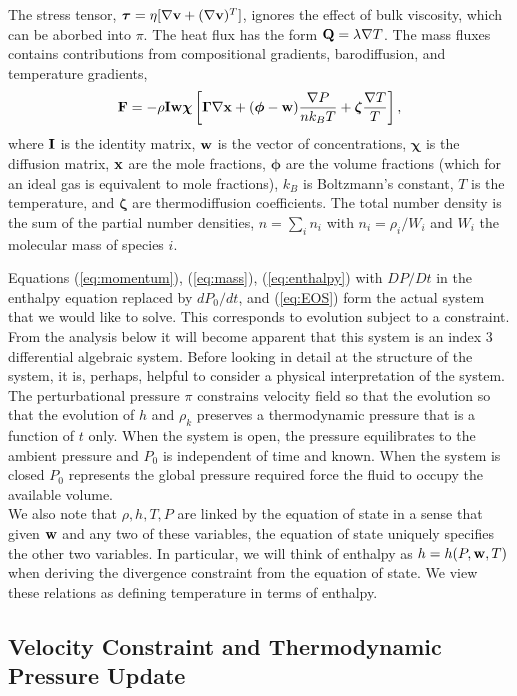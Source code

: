 \documentclass[final]{siamltex}
\def\Fb {{\bf F}}
\def\Ib {{\bf I}}
\def\Qb {{\bf Q}}
\def\vb {{\bf v}}
\def\wb {{\bf w}}
\def\xb {{\bf x}}
\def\chib   {\boldsymbol{\chi}}
\def\Gammab {\boldsymbol{\Gamma}}
\def\phib   {\boldsymbol{\phi}}
\def\taub   {\boldsymbol{\tau}}
\def\zetab  {\boldsymbol{\zeta}}
\begin{document}
The stress tensor,
$\taub = \eta[\nabla\vb + (\nabla\vb)^T]$,
ignores the effect of bulk viscosity, which can be aborbed into $\pi$.
The heat flux has the form $\Qb = \lambda\nabla T$.
The mass fluxes contains contributions from 
compositional gradients, barodiffusion, and temperature gradients,
\begin{equation}
\Fb = -\rho\Ib\wb\chib\left[\Gammab\nabla\xb + (\phib - \wb)\frac{\nabla P}{n k_B T} + \zetab\frac{\nabla T}{T}\right],
\end{equation}
where $\Ib$ is the identity matrix, $\wb$ is the vector of concentrations,
$\chib$ is the diffusion matrix, $\xb$ are the mole fractions,
$\phib$ are the volume fractions (which for an ideal gas is equivalent to mole fractions),
$k_B$ is Boltzmann's constant,
$T$ is the temperature, and $\zetab$ are thermodiffusion coefficients.  The total
number density is the sum of the partial number densities, $n=\sum_i n_i$ with
$n_i=\rho_i/W_i$ and $W_i$ the molecular mass of species $i$.

Equations (\ref{eq:momentum}), (\ref{eq:mass}), (\ref{eq:enthalpy})
with $DP/Dt$ in the enthalpy equation replaced by $dP_0/dt$, and (\ref{eq:EOS})
form the actual system that we would like to solve.
This corresponds to evolution subject to a constraint.  From the analysis below it 
will become apparent that this system is an index 3 differential algebraic system.
Before looking in detail at the structure of the system, it is, perhaps, helpful to 
consider a physical interpretation of the
system.  The perturbational pressure $\pi$ constrains velocity field so that
the evolution so that the evolution of $h$ and $\rho_k$
preserves a thermodynamic pressure that is a function of $t$ only.
When the system is open, the pressure
equilibrates to the ambient pressure and $P_0$ is independent of time and known.
When the system is closed
$P_0$ represents the global pressure
required force the fluid to occupy the available volume.\\

We also note that $\rho, h, T, P$ are linked by the equation of state in a sense that given
$\wb$ and any two of these variables, the equation of state uniquely specifies the other
two variables.  In particular, we will think of enthalpy as $h = h(P,\wb,T)$ when deriving
the divergence constraint from the equation of state.
We view these relations as defining temperature in terms of enthalpy.

\subsection{Velocity Constraint and Thermodynamic Pressure Update}
\end{document}
